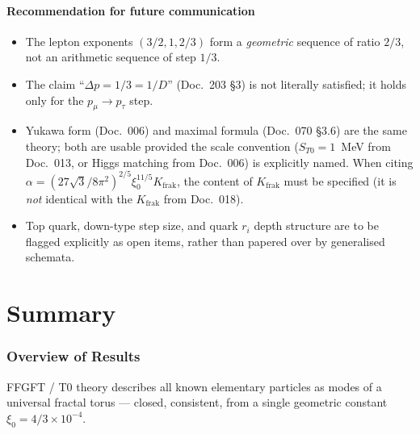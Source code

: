 \subsection{Recommendation for future communication}

\begin{itemize}[leftmargin=2em,itemsep=2pt,topsep=2pt]
  \item The lepton exponents $(3/2, 1, 2/3)$ form a
        \emph{geometric} sequence of ratio $2/3$, not an arithmetic
        sequence of step $1/3$.
  \item The claim \enquote{$\Delta p = 1/3 = 1/D$} (Doc.~203 §3) is not literally satisfied; it
        holds only for the $p_\mu \to p_\tau$ step.
  \item Yukawa form (Doc.~006) and maximal formula (Doc.~070 §3.6)
        are the same theory; both are usable provided the scale
        convention ($S_{T0} = 1$~MeV from Doc.~013, or Higgs matching
        from Doc.~006) is explicitly named. When citing
        $\alpha = (27\sqrt{3}/8\pi^2)^{2/5}\xi_0^{11/5} K_{\text{frak}}$,
        the content of $K_{\text{frak}}$ must be specified (it is
        \emph{not} identical with the $K_{\text{frak}}$ from Doc.~018).
  \item Top quark, down-type step size, and quark $r_i$ depth
        structure are to be flagged explicitly as open items,
        rather than papered over by generalised schemata.
\end{itemize}

\part{Summary}

\section{Overview of Results}

FFGFT / T0 theory describes all known elementary particles as modes
of a universal fractal torus — closed, consistent, from a single
geometric constant $\xi_0 = 4/3 \times 10^{-4}$.

